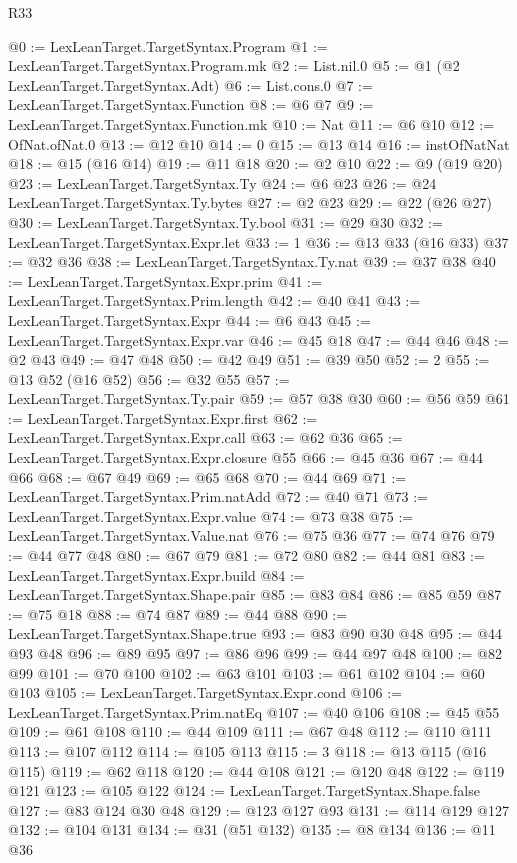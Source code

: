 \begin{lexlean}{R33}
\begin{coremodule}
@0 := LexLeanTarget.TargetSyntax.Program
@1 := LexLeanTarget.TargetSyntax.Program.mk
@2 := List.nil.{0}
@5 := @1 (@2 LexLeanTarget.TargetSyntax.Adt)
@6 := List.cons.{0}
@7 := LexLeanTarget.TargetSyntax.Function
@8 := @6 @7
@9 := LexLeanTarget.TargetSyntax.Function.mk
@10 := Nat
@11 := @6 @10
@12 := OfNat.ofNat.{0}
@13 := @12 @10
@14 := 0
@15 := @13 @14
@16 := instOfNatNat
@18 := @15 (@16 @14)
@19 := @11 @18
@20 := @2 @10
@22 := @9 (@19 @20)
@23 := LexLeanTarget.TargetSyntax.Ty
@24 := @6 @23
@26 := @24 LexLeanTarget.TargetSyntax.Ty.bytes
@27 := @2 @23
@29 := @22 (@26 @27)
@30 := LexLeanTarget.TargetSyntax.Ty.bool
@31 := @29 @30
@32 := LexLeanTarget.TargetSyntax.Expr.let
@33 := 1
@36 := @13 @33 (@16 @33)
@37 := @32 @36
@38 := LexLeanTarget.TargetSyntax.Ty.nat
@39 := @37 @38
@40 := LexLeanTarget.TargetSyntax.Expr.prim
@41 := LexLeanTarget.TargetSyntax.Prim.length
@42 := @40 @41
@43 := LexLeanTarget.TargetSyntax.Expr
@44 := @6 @43
@45 := LexLeanTarget.TargetSyntax.Expr.var
@46 := @45 @18
@47 := @44 @46
@48 := @2 @43
@49 := @47 @48
@50 := @42 @49
@51 := @39 @50
@52 := 2
@55 := @13 @52 (@16 @52)
@56 := @32 @55
@57 := LexLeanTarget.TargetSyntax.Ty.pair
@59 := @57 @38 @30
@60 := @56 @59
@61 := LexLeanTarget.TargetSyntax.Expr.first
@62 := LexLeanTarget.TargetSyntax.Expr.call
@63 := @62 @36
@65 := LexLeanTarget.TargetSyntax.Expr.closure @55
@66 := @45 @36
@67 := @44 @66
@68 := @67 @49
@69 := @65 @68
@70 := @44 @69
@71 := LexLeanTarget.TargetSyntax.Prim.natAdd
@72 := @40 @71
@73 := LexLeanTarget.TargetSyntax.Expr.value
@74 := @73 @38
@75 := LexLeanTarget.TargetSyntax.Value.nat
@76 := @75 @36
@77 := @74 @76
@79 := @44 @77 @48
@80 := @67 @79
@81 := @72 @80
@82 := @44 @81
@83 := LexLeanTarget.TargetSyntax.Expr.build
@84 := LexLeanTarget.TargetSyntax.Shape.pair
@85 := @83 @84
@86 := @85 @59
@87 := @75 @18
@88 := @74 @87
@89 := @44 @88
@90 := LexLeanTarget.TargetSyntax.Shape.true
@93 := @83 @90 @30 @48
@95 := @44 @93 @48
@96 := @89 @95
@97 := @86 @96
@99 := @44 @97 @48
@100 := @82 @99
@101 := @70 @100
@102 := @63 @101
@103 := @61 @102
@104 := @60 @103
@105 := LexLeanTarget.TargetSyntax.Expr.cond
@106 := LexLeanTarget.TargetSyntax.Prim.natEq
@107 := @40 @106
@108 := @45 @55
@109 := @61 @108
@110 := @44 @109
@111 := @67 @48
@112 := @110 @111
@113 := @107 @112
@114 := @105 @113
@115 := 3
@118 := @13 @115 (@16 @115)
@119 := @62 @118
@120 := @44 @108
@121 := @120 @48
@122 := @119 @121
@123 := @105 @122
@124 := LexLeanTarget.TargetSyntax.Shape.false
@127 := @83 @124 @30 @48
@129 := @123 @127 @93
@131 := @114 @129 @127
@132 := @104 @131
@134 := @31 (@51 @132)
@135 := @8 @134
@136 := @11 @36

\end{coremodule}
\end{lexlean}
